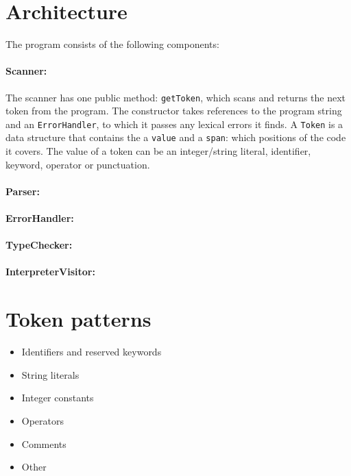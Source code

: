 \documentclass[a4paper]{article}
\newcommand*{\code}[1]{\lstinline{#1}}
\begin{document}
\section{Architecture}

The program consists of the following components:

\paragraph*{Scanner:} The scanner has one public method: \code{getToken}, 
which scans and returns the next token from the program. The 
constructor takes references to the program string and an 
\code{ErrorHandler}, to which it passes any lexical errors it finds.
A \code{Token} is a data structure that contains the a \code{value} and 
a \code{span}: which positions of the code it covers.
The value of a token can be an integer/string literal, 
identifier, keyword, operator or punctuation.

\paragraph*{Parser:}

\paragraph*{ErrorHandler:}

\paragraph*{TypeChecker:}

\paragraph*{InterpreterVisitor:}



\section{Token patterns}

\begin{itemize}
  \item Identifiers and reserved keywords
  \item String literals
  \item Integer constants
  \item Operators
  \item Comments
  \item Other
\end{itemize}
\end{document}
